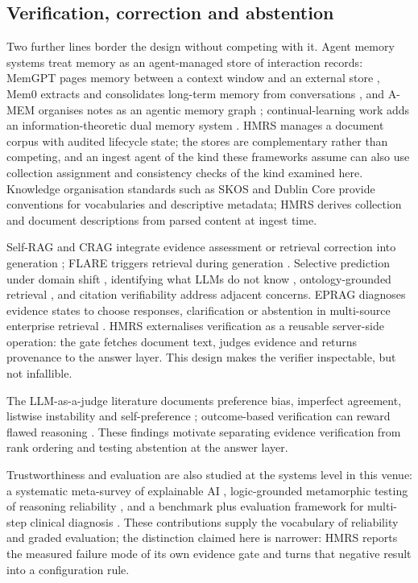 \subsection{Verification, correction and abstention}
Two further lines border the design without competing with it. Agent memory
systems treat memory as an agent-managed store of interaction records:
MemGPT pages memory between a context window and an external store
\citep{memgpt}, Mem0 extracts and consolidates long-term memory from
conversations \citep{mem0}, and A-MEM organises notes as an agentic memory
graph \citep{amem}; continual-learning work adds an information-theoretic dual
memory system \citep{wu2025informati}. HMRS manages a document corpus with audited lifecycle
state; the stores are complementary rather than competing, and an ingest
agent of the kind these frameworks assume can also use collection assignment
and consistency checks of the kind examined here. Knowledge organisation
standards such as SKOS \citep{skos} and Dublin Core provide conventions for
vocabularies and descriptive metadata; HMRS derives collection and document
descriptions from parsed content at ingest time.

Self-RAG and CRAG integrate evidence assessment or retrieval correction into
generation \citep{selfrag,crag}; FLARE triggers retrieval during generation
\citep{flare}. Selective prediction under domain shift \citep{kamath},
identifying what LLMs do not know \citep{feng-abstain,yin-knowwhat},
ontology-grounded retrieval \citep{cyberbot}, and citation verifiability
\citep{liu-verifiability,gao-citations} address adjacent concerns. EPRAG
diagnoses evidence states to choose responses, clarification or abstention in
multi-source enterprise retrieval \citep{kinalioglu-kbs-eprag-2026}. HMRS externalises
verification as a reusable server-side operation: the gate fetches document
text, judges evidence and returns provenance to the answer layer. This design
makes the verifier inspectable, but not infallible.

The LLM-as-a-judge literature documents preference bias, imperfect agreement,
listwise instability and self-preference \citep{zheng-llmjudge,sun-urara,panickssery-selfpref}; outcome-based verification can reward flawed reasoning
\citep{lightman-verify}. These findings motivate separating evidence
verification from rank ordering and testing abstention at the answer layer.

Trustworthiness and evaluation are also studied at the systems level in this
venue: a systematic meta-survey of explainable AI \citep{saeed2023explainab},
logic-grounded metamorphic testing of reasoning reliability
\citep{zhou2026lgmt}, and a benchmark plus evaluation framework for multi-step
clinical diagnosis \citep{hou2025msdiagnos}. These contributions supply the
vocabulary of reliability and graded evaluation; the distinction claimed here
is narrower: HMRS reports the measured failure mode of its own evidence gate
and turns that negative result into a configuration rule.

